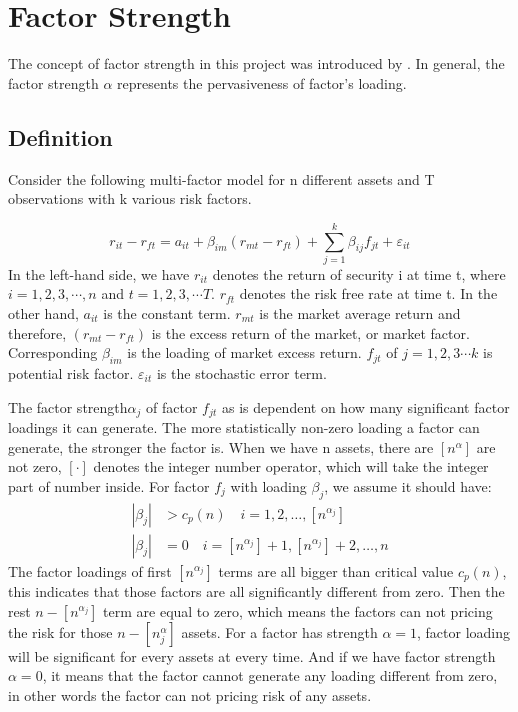 \documentclass[12pt]{article}
\begin{document}
\section{Factor Strength}\label{strength}
The concept of factor strength in this project was introduced by . 
In general, the factor strength $\alpha$ represents the pervasiveness of factor's loading.
	\subsection{Definition}

Consider the following multi-factor model for n different assets and T observations with  k various risk factors.

\[   r_{it} - r_{ft} = a_{it}+ \beta_{im}(r_{mt} - r_{ft}) + \sum_{j=1}^{k}\beta_{ij}f_{jt} + \varepsilon_{it} \tag{1}\label{2CAPM} \]
In the left-hand side, we have $r_{it}$ denotes the return of  security i at time t, where $i = 1, 2,3, \cdots, n$ and $t = 1,2,3, \cdots T$.  
$r_{ft}$ denotes the risk free rate at time t.
In the other hand, $a_{it}$ is the constant term. 
$r_{mt}$ is the market average return and therefore, $(r_{mt} - r_{ft}) $ is the excess return of the market, or market factor.
Corresponding $\beta_{im}$ is the loading of market excess return.
$f_{jt}$ of $j = 1, 2, 3\cdots k$ is potential risk factor.
$\varepsilon_{it}$ is the stochastic error term.

The factor strength$\alpha_j$ of factor $f_{jt}$ as is dependent on how many significant factor loadings it can generate.
The more statistically non-zero loading a factor can generate, the stronger the factor is.
When we have n assets, there are $[n^{\alpha}]$ are not zero, $[\cdot]$ denotes the integer number operator, which will take the integer part of number inside. 
For factor $f_{j}$ with loading $\beta_j$, we assume it should have:
\begin{align*}
|\beta_{j}| &> c_p(n)\quad i = 1, 2,  \dots, [n^{\alpha_j}]\\
|\beta_{j}| &= 0 \quad i = [n^{\alpha_j}] + 1, [n^{\alpha_j}] +2 ,\dots, n
\end{align*}
The factor loadings of first $[n^{\alpha_j}]$ terms are all bigger than critical value $c_p(n)$, this indicates that those factors are all significantly different from zero.
Then the rest $n - [n^{\alpha_j}]$ term are equal to zero, which means the factors can not pricing the risk for those $n - [n^\alpha_j]$ assets.
For a factor has strength $\alpha = 1$,  factor loading will be significant for every assets at every time. 
And if we have factor strength $\alpha = 0$, it means that the factor cannot generate any loading different from zero, in other words the factor can not pricing risk of any assets.
\end{document}
